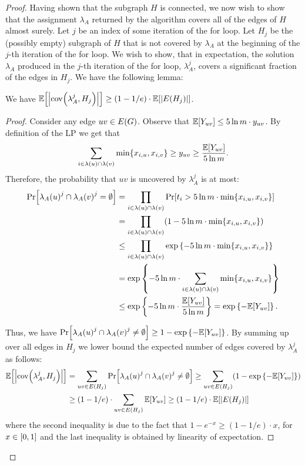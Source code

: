 \begin{proof}
Having shown that the subgraph $H$ is connected, we now wish to show that the assignment $\lambda_A$ returned by the algorithm covers all of the edges of $H$ almost surely. 
Let $j$ be an index of some iteration of the for loop. Let $H_j$ be the (possibly empty) subgraph of $H$ that is not covered by $\lambda_A$ at the beginning of the $j$-th iteration of the for loop. We wish to show, that in expectation, the solution $\lambda_A$ produced in the $j$-th iteration of the for loop, $\lambda_A^j$, covers a significant fraction of the edges in $H_j$. We have the following lemma:
\begin{lemma}
    We have
    $\mathbb{E}\mathopen{}\left[ \mathopen{}\left| \operatorname{cov}\mathopen{}\left( \lambda_A^j, H_j \right) \right| \right] \geq \mathopen{}\left( 1-1/e \right) \cdot \mathbb{E}\mathopen{}\left[ \mathopen{}\left| E\mathopen{}\left( H_j \right) \right| \right]$.
\end{lemma}
\begin{proof}
    Consider any edge $uv\in E\mathopen{}\left( G \right)$. Observe that $\mathbb{E}\mathopen{}\left[ Y_{uv} \right]\leq 5\ln m \cdot y_{uv}$. By definition of the LP we get that \[
        \sum_{i\in\lambda\mathopen{}\left( u \right)\cap\lambda\mathopen{}\left( v \right)}\min\mathopen{}\left\{ x_{i, u}, x_{i, v} \right\} \geq y_{uv} \geq \frac{\mathbb{E}\mathopen{}\left[ Y_{uv} \right]}{5\ln m}.\]
    Therefore, the probability that $uv$ is uncovered by $\lambda_A^j$ is at most:
    \begin{align*}
        \Pr\mathopen{}\left[ \lambda_A\mathopen{}\left( u \right)^j\cap\lambda_A\mathopen{}\left( v \right)^j=\emptyset \right] & = \prod_{i\in\lambda\mathopen{}\left( u \right)\cap\lambda\mathopen{}\left( v \right)}\Pr\mathopen{}\left[ t_i > 5\ln m\cdot\min\mathopen{}\left\{ x_{i, u}, x_{i, v} \right\} \right] \\ 
        & = \prod_{i\in\lambda\mathopen{}\left( u \right)\cap\lambda\mathopen{}\left( v \right)}\mathopen{}\left( 1-5\ln m\cdot\min\mathopen{}\left\{ x_{i, u}, x_{i, v} \right\} \right) \\& \leq \prod_{i\in\lambda\mathopen{}\left( u \right)\cap\lambda\mathopen{}\left( v \right)}\exp\left\{ -5\ln m\cdot\min\mathopen{}\left\{ x_{i, u}, x_{i, v} \right\} \right\}\\ 
        & = \exp\left\{ -5\ln m\cdot\sum_{i\in\lambda\mathopen{}\left( u \right)\cap\lambda\mathopen{}\left( v \right)}\min\mathopen{}\left\{ x_{i, u}, x_{i, v} \right\} \right\} \\& \leq \exp\left\{ -5\ln m\cdot\frac{\mathbb{E}\mathopen{}\left[ Y_{uv} \right]}{5\ln m} \right\}=\exp\left\{ -\mathbb{E}\mathopen{}\left[ Y_{uv} \right] \right\}.
    \end{align*}
    
    Thus, we have $\Pr\mathopen{}\left[ \lambda_A\mathopen{}\left( u \right)^j\cap\lambda_A\mathopen{}\left( v \right)^j\neq\emptyset \right]\geq 1-\exp\left\{ -\mathbb{E}\mathopen{}\left[ Y_{uv} \right]  \right\}$. By summing up over all edges in $H_j$ we lower bound the expected number of edges covered by $\lambda_A^j$ as follows:
    \begin{align*}
        \mathbb{E}\mathopen{}\left[ \mathopen{}\left| \operatorname{cov}\mathopen{}\left( \lambda_A^j, H_j \right) \right| \right] & = \sum_{uv\in E\mathopen{}\left( H_j \right)}\Pr\mathopen{}\left[ \lambda_A\mathopen{}\left( u \right)^j\cap\lambda_A\mathopen{}\left( v \right)^j\neq\emptyset \right]  
        \geq \sum_{uv\in E\mathopen{}\left( H_j \right)}\mathopen{}\left( 1-\exp\left\{ -\mathbb{E}\mathopen{}\left[ Y_{uv} \right]  \right\} \right)
        \\& \geq \mathopen{}\left( 1-1/e \right)\cdot \sum_{uv\in E\mathopen{}\left( H_j \right)}{\mathbb{E}\mathopen{}\left[ Y_{uv} \right]} \geq \mathopen{}\left( 1-1/e \right) \cdot \mathbb{E}\mathopen{}\left[ \mathopen{}\left| E\mathopen{}\left( H_j \right) \right| \right]
    \end{align*}
    where the second inequality is due to the fact that $1-e^{-x}\geq (1-1/e)\cdot x$, for $x\in\mathopen{}\left[ 0,1 \right]$ and the last inequality is obtained by linearity of expectation.
\end{proof}


\end{proof}

